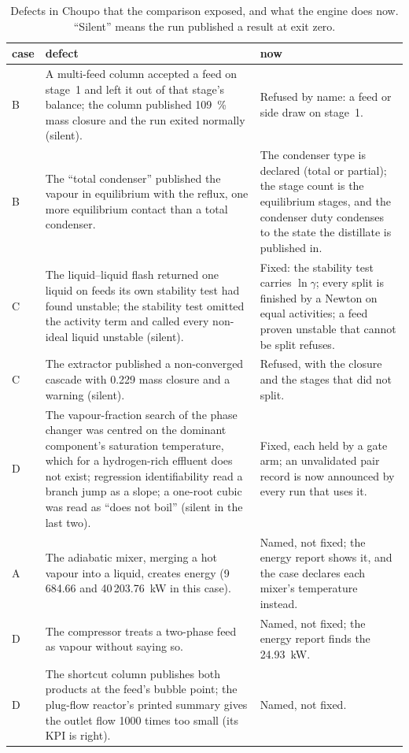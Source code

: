 \documentclass[11pt,a4paper]{article}
\begin{document}
\begin{table}[htbp]
\centering\scriptsize
\caption{Defects in Choupo that the comparison exposed, and what the engine
does now.  ``Silent'' means the run published a result at exit zero.}
\label{tab:benchdefects}
\begin{tabularx}{\textwidth}{@{}p{0.6cm}X p{4.6cm}@{}}
\toprule
\textbf{case} & \textbf{defect} & \textbf{now} \\
\midrule
B & A multi-feed column accepted a feed on stage~1 and left it out of
    that stage's balance; the column published 109~\% mass closure and the
    run exited normally (silent).
  & Refused by name: a feed or side draw on stage~1. \\
B & The ``total condenser'' published the vapour in equilibrium with the
    reflux, one more equilibrium contact than a total condenser.
  & The condenser type is declared (total or partial); the stage count is
    the equilibrium stages, and the condenser duty condenses to the state
    the distillate is published in. \\
C & The liquid--liquid flash returned one liquid on feeds its own stability
    test had found unstable; the stability test omitted the activity term
    and called every non-ideal liquid unstable (silent).
  & Fixed: the stability test carries $\ln\gamma$; every split is finished
    by a Newton on equal activities; a feed proven unstable that cannot be
    split refuses. \\
C & The extractor published a non-converged cascade with 0.229 mass
    closure and a warning (silent).
  & Refused, with the closure and the stages that did not split. \\
D & The vapour-fraction search of the phase changer was centred on the
    dominant component's saturation temperature, which for a
    hydrogen-rich effluent does not exist; regression identifiability read
    a branch jump as a slope; a one-root cubic was read as ``does not
    boil'' (silent in the last two).
  & Fixed, each held by a gate arm; an unvalidated pair record is now
    announced by every run that uses it. \\
A & The adiabatic mixer, merging a hot vapour into a liquid, creates
    energy (9\,684.66 and 40\,203.76~kW in this case).
  & Named, not fixed; the energy report shows it, and the case declares
    each mixer's temperature instead. \\
D & The compressor treats a two-phase feed as vapour without saying so.
  & Named, not fixed; the energy report finds the 24.93~kW. \\
D & The shortcut column publishes both products at the feed's bubble
    point; the plug-flow reactor's printed summary gives the outlet flow
    1000 times too small (its KPI is right).
  & Named, not fixed. \\
\bottomrule
\end{tabularx}
\end{table}
\end{document}
